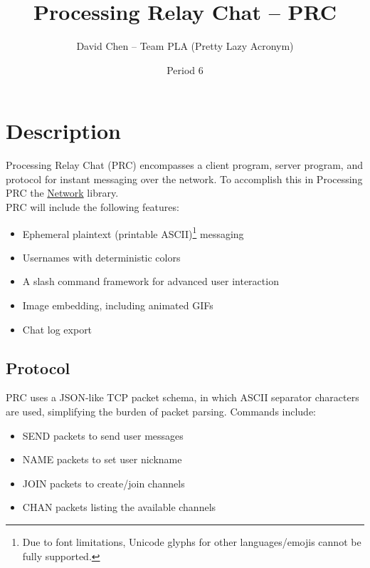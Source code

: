 \documentclass{article}
\title{Processing Relay Chat -- PRC}
\author{David Chen -- Team PLA (Pretty Lazy Acronym)}
\date{Period 6}
\begin{document}
\maketitle

\section{Description}
Processing Relay Chat (PRC) encompasses a client program, server program, and protocol for instant messaging over the network. To accomplish this in Processing PRC the \href{https://processing.org/reference/libraries/net/index.html}{Network} library.\\
PRC will include the following features:
\begin{itemize}
    \item Ephemeral plaintext (printable ASCII)\footnote{Due to font limitations, Unicode glyphs for other languages/emojis cannot be fully supported.} messaging
    \item Usernames with deterministic colors
    \item A slash command framework for advanced user interaction
    \item Image embedding, including animated GIFs
    \item Chat log export
\end{itemize}

\subsection{Protocol}
PRC uses a JSON-like TCP packet schema, in which ASCII separator characters are used, simplifying the burden of packet parsing. Commands include:
\begin{itemize}
   \item SEND packets to send user messages
   \item NAME packets to set user nickname
   \item JOIN packets to create/join channels
   \item CHAN packets listing the available channels
\end{itemize}

\end{document}
